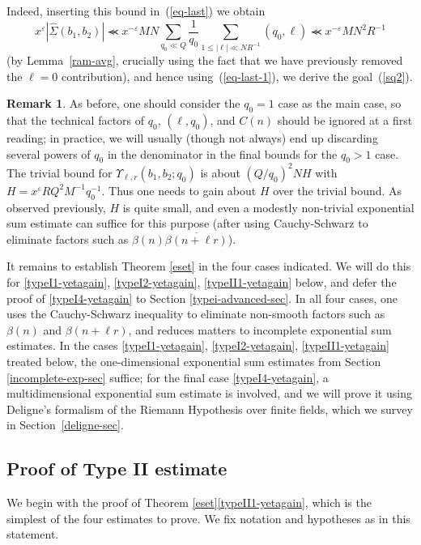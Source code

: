 \documentclass[12pt,a4paper,reqno]{amsart}
\numberwithin{equation}{section}
\theoremstyle{plain}
\theoremstyle{definition}
\newtheorem{remark}[theorem]{Remark}
\newcommand\eps{\varepsilon}
\renewcommand{\lessapprox}{\llcurly}
\begin{document}
Indeed, inserting this bound in~(\ref{eq-last}) we obtain
$$
x^{\eps}|\hat{\Sigma}(b_1,b_2)|\lessapprox x^{-\eps}MN\sum_{q_0\ll Q}
\frac{1}{q_0} \sum_{1\leq |\ell|\ll NR^{-1}}(q_0,\ell) \lessapprox
x^{-\eps}MN^2R^{-1}
$$
(by Lemma~\ref{ram-avg}, crucially using the fact that we have previously removed the $\ell=0$ contribution), and hence using~(\ref{eq-last-1}), we derive
the goal~(\ref{sq2}).

\begin{remark} As before, one should consider the $q_0=1$ case as the main case, so that the technical factors of $q_0$, $(\ell,q_0)$, and $C(n)$ should be ignored at a first reading; in practice, we will usually (though not always) end up discarding several powers of $q_0$ in the denominator in the final bounds for the $q_0>1$ case.
The trivial bound for $\Upsilon_{\ell,r}(b_1,b_2;q_0)$
  is about $ (Q/q_0)^2 N H$ with $H=x^{\eps}RQ^2M^{-1}q_0^{-1}$.  Thus
  one needs to gain about $H$ over the trivial bound.  As observed
  previously, $H$ is quite small, and even a modestly non-trivial
  exponential sum estimate can suffice for this purpose (after using
  Cauchy-Schwarz to eliminate factors such as $\beta(n)
  \overline{\beta(n+\ell r)}$).
\end{remark}


It remains to establish Theorem \ref{eset} in the four cases
indicated.  We will do this for \eqref{typeI1-yetagain},
\eqref{typeI2-yetagain}, \eqref{typeII1-yetagain} below, and defer the
proof of \eqref{typeI4-yetagain} to Section \ref{typei-advanced-sec}.
In all four cases, one uses the Cauchy-Schwarz inequality to
eliminate non-smooth factors such as $\beta(n)$ and $\beta(n+\ell r)$, and
reduces matters to incomplete exponential sum estimates.  In the cases
\eqref{typeI1-yetagain}, \eqref{typeI2-yetagain}, \eqref{typeII1-yetagain} treated below, the one-dimensional exponential sum estimates from Section
\ref{incomplete-exp-sec} suffice; for the final case \eqref{typeI4-yetagain}, a
multidimensional exponential sum estimate is involved, and we will
prove it using Deligne's formalism of the Riemann Hypothesis over
finite fields, which we survey in Section~\ref{deligne-sec}.

\subsection{Proof of Type II estimate}\label{typeii-sec}

We begin with the proof of Theorem \ref{eset}\eqref{typeII1-yetagain},
which is the simplest of the four estimates to prove. We fix notation
and hypotheses as in this statement. 
\end{document}

